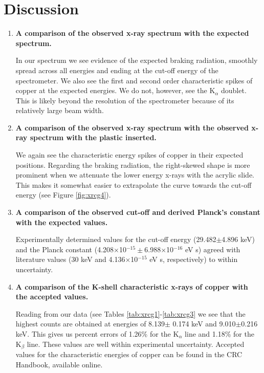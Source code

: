 \section{Discussion}
\begin{enumerate}[resume]

\item {\bf A comparison of the observed x-ray spectrum with the expected spectrum.}\newline

In our spectrum we see evidence of the expected braking radiation, smoothly spread across all energies and ending at the cut-off energy of the spectrometer. We also see the first and second order characteristic spikes of copper at the expected energies. We do not, however, see the K$_{\alpha}$ doublet. This is likely beyond the resolution of the spectrometer because of its relatively large beam width.

\item {\bf A comparison of the observed x-ray spectrum with the observed x-ray spectrum with the plastic inserted.}\newline

We again see the characteristic energy spikes of copper in their expected positions. Regarding the braking radiation, the right-skewed shape is more prominent when we attenuate the lower energy x-rays with the acrylic slide. This makes it somewhat easier to extrapolate the curve towards the cut-off energy (see Figure \ref{fig:xrcg4}).

\item {\bf A comparison of the observed cut-off and derived Planck's constant with the expected values.}\newline

Experimentally determined values for the cut-off energy (29.482$\pm$4.896 keV) and the Planck constant (4.208$\times$10$^{-15}\pm$6.988$\times$10$^{-16}$ eV s) agreed with literature values (30 keV and 4.136$\times$10$^{-15}$ eV s, respectively) to within uncertainty.

\item {\bf A comparison of the K-shell characteristic x-rays of copper with the accepted values.}\newline

Reading from our data (see Tables \ref{tab:xrcg1}-\ref{tab:xrcg3} we see that the highest counts are obtained at energies of 8.139$\pm$ 0.174 keV and 9.010$\pm$0.216 keV. This gives us percent errors of 1.26\% for the K$_{\alpha}$ line and 1.18\% for the K$_{\beta}$ line. These values are well within experimental uncertainty. Accepted values for the characteristic energies of copper can be found in the CRC Handbook, available online.


\end{enumerate}
